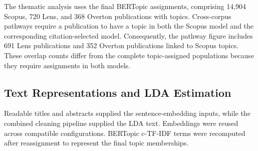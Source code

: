 \documentclass[a4paper,fleqn]{cas-sc}
\begin{document}
    The thematic analysis uses the final BERTopic assignments, comprising 14,904 Scopus, 720 Lens, and 368 Overton publications with topics. Cross-corpus pathways require a publication to have a topic in both the Scopus model and the corresponding citation-selected model. Consequently, the pathway figure includes 691 Lens publications and 352 Overton publications linked to Scopus topics. These overlap counts differ from the complete topic-assigned populations because they require assignments in both models.
    
    \subsection{Text Representations and LDA Estimation}\label{sec:text_preprocessing}
    
    Readable titles and abstracts supplied the sentence-embedding inputs, while the combined cleaning pipeline supplied the LDA text. Embeddings were reused across compatible configurations. BERTopic c-TF-IDF terms were recomputed after reassignment to represent the final topic memberships.
    
    
\end{document}
